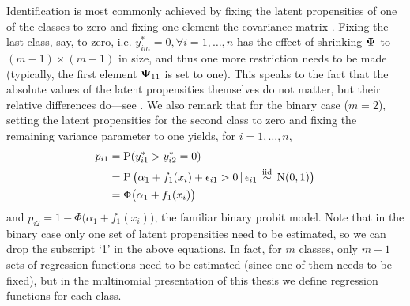 \begin{remark}
  Identification is most commonly achieved by fixing the latent propensities of one of the classes to zero and fixing one element the covariance matrix \citep{dansie1985parameter,bunch1991estimability}.
  Fixing the last class, say, to zero, i.e. $y_{im}^* = 0,\forall i=1,\dots,n$ has the effect of shrinking ${\bm\Psi}$ to $(m-1)\times(m-1)$ in size, and thus one more restriction needs to be made (typically, the first element ${\bm\Psi}_{11}$ is set to one).
  This speaks to the fact that the absolute values of the latent propensities themselves do not matter, but their relative differences do---see .   
  We also remark that for the binary case ($m=2$), setting the latent propensities for the second class to zero and fixing the remaining variance parameter to one yields, for $i=1,\dots,n$,
  \begin{align*}
    p_{i1} 
    &= \operatorname{P}(y_{i1}^* > y_{i2}^* = 0) \\
    &= \operatorname{P}\big(\alpha_1 + f_1(x_i) + \epsilon_{i1} > 0 \,|\, \epsilon_{i1} \,\overset{\text{iid}}{\sim}\, \operatorname{N}(0,1) \big) \\
    &= \Phi\big( \alpha_1 + f_1(x_i) \big)
  \end{align*}
  and $p_{i2} = 1 - \Phi\big( \alpha_1 + f_1(x_i) \big)$, the familiar binary probit model.
  Note that in the binary case only one set of latent propensities need to be estimated, so we can drop the subscript `1' in the above equations.
  In fact, for $m$ classes, only $m-1$ sets of regression functions need to be estimated (since one of them needs to be fixed), but in the multinomial presentation of this thesis we define regression functions for each class.
\end{remark}



